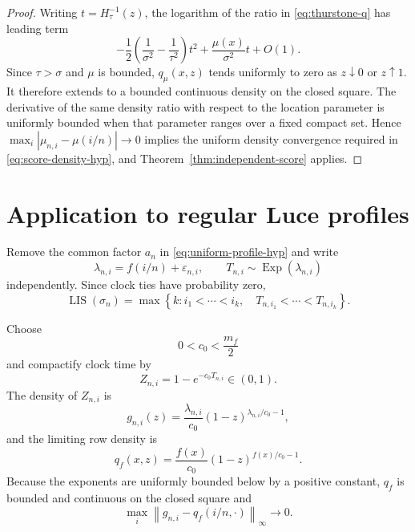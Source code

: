 \documentclass[11pt]{article}
\theoremstyle{remark}
\newcommand{\Exp}{\operatorname{Exp}}
\newcommand{\LIS}{\operatorname{LIS}}
\newcommand{\eps}{\varepsilon}
\newcommand{\norm}[1]{\left\lVert #1\right\rVert}
\begin{document}
\begin{proof}
Writing $t=H_\tau^{-1}(z)$, the logarithm of the ratio in
\eqref{eq:thurstone-q} has leading term
\[
 -\frac12\left(\frac1{\sigma^2}-\frac1{\tau^2}\right)t^2
 +\frac{\mu(x)}{\sigma^2}t+O(1).
\]
Since $\tau>\sigma$ and $\mu$ is bounded, $q_\mu(x,z)$ tends uniformly to
zero as $z\downarrow0$ or $z\uparrow1$.  It therefore extends to a bounded
continuous density on the closed square.  The derivative of the same density
ratio with respect to the location parameter is uniformly bounded when that
parameter ranges over a fixed compact set.  Hence
$\max_i|\mu_{n,i}-\mu(i/n)|\to0$ implies the uniform density convergence
required in \eqref{eq:score-density-hyp}, and
Theorem~\ref{thm:independent-score} applies.
\end{proof}


\section{Application to regular Luce profiles}
\label{sec:luce-application}

Remove the common factor $a_n$ in \eqref{eq:uniform-profile-hyp} and write
\[
        \lambda_{n,i}=f(i/n)+\eps_{n,i},
        \qquad
        T_{n,i}\sim\Exp(\lambda_{n,i})
\]
independently.  Since clock ties have probability zero,
\begin{equation}\label{eq:exact-lis-clock}
 \LIS(\sigma_n)
 =\max\left\{k:
    i_1<\cdots<i_k,\quad
    T_{n,i_1}<\cdots<T_{n,i_k}\right\}.
\end{equation}

Choose
\begin{equation}\label{eq:c-choice}
        0<c_0<\frac{m_f}{2}
\end{equation}
and compactify clock time by
\begin{equation}\label{eq:compactification}
        Z_{n,i}=1-e^{-c_0T_{n,i}}\in(0,1).
\end{equation}
The density of $Z_{n,i}$ is
\begin{equation}\label{eq:gin-luce}
        g_{n,i}(z)
        =\frac{\lambda_{n,i}}{c_0}
         (1-z)^{\lambda_{n,i}/c_0-1},
\end{equation}
and the limiting row density is
\begin{equation}\label{eq:qf-def}
        q_f(x,z)=\frac{f(x)}{c_0}
        (1-z)^{f(x)/c_0-1}.
\end{equation}
Because the exponents are uniformly bounded below by a positive constant,
$q_f$ is bounded and continuous on the closed square and
\begin{equation}\label{eq:luce-density-uniform}
        \max_i\norm{g_{n,i}-q_f(i/n,\cdot)}_\infty
        \longrightarrow0.
\end{equation}
\end{document}
